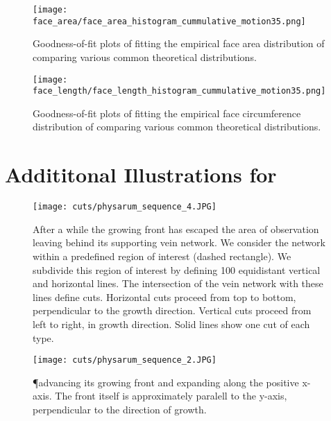 \begin{figure}[!htbp]
\begin{center}%
  \texttt{[image: face\_area/face\_area\_histogram\_cummulative\_motion35.png]}
\end{center}%
\caption[Goodness-of-fit plots - Face area]{Goodness-of-fit plots of fitting the empirical face area distribution of  comparing various common theoretical distributions.}
\label{fig:sup::face_area_goodness}
\end{figure}

\begin{figure}[!htbp]
\begin{center}%
  \texttt{[image: face\_length/face\_length\_histogram\_cummulative\_motion35.png]}
\end{center}%
\caption[Goodness-of-fit plots - Face circumference]{Goodness-of-fit plots of fitting the empirical face circumference distribution of  comparing various common theoretical distributions.}
\label{fig:sup::face_length_goodness}
\end{figure}

\section{Addititonal Illustrations for }

\vfill
\begin{figure}[!htbp]
\begin{center}%
  \texttt{[image: cuts/physarum\_sequence\_4.JPG]}
\end{center}%
\caption[Horizontal and vertical cuts illustrated]{After a while the growing front has escaped the area of observation leaving behind its supporting vein network. We consider the network within a predefined region of interest (dashed rectangle). We subdivide this region of interest by defining 100 equidistant vertical and horizontal lines. The intersection of the vein network with these lines define cuts. Horizontal cuts proceed from top to bottom, \ie perpendicular to the growth direction. Vertical cuts proceed from left to right, \ie in growth direction. Solid lines show one cut of each type.}
\label{fig:sup::physarum_roi}
\end{figure}
\vfill
\begin{figure}[!htbp]
\begin{center}%
  \texttt{[image: cuts/physarum\_sequence\_2.JPG]}
\end{center}%
\caption[Detail of the apical zone]{\P advancing its growing front and expanding along the positive x-axis. The front itself is approximately paralell to the y-axis, \ie perpendicular to the direction of growth.}
\label{fig:sup::physarum_expanding}
\end{figure}
\vfill

